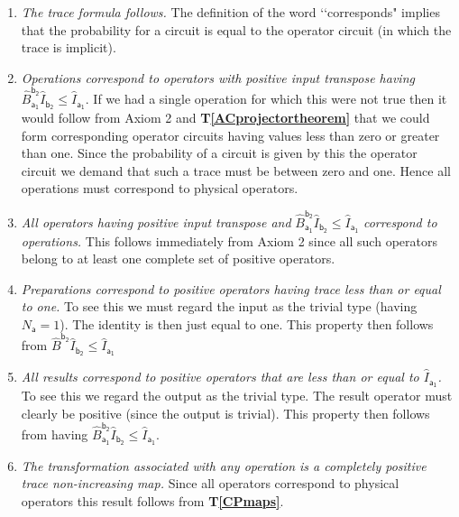 \documentclass[10pt]{article}
\begin{document}
\begin{enumerate}
\item \emph{The trace formula follows.}  The definition of the word \lq\lq corresponds" implies that the probability for a circuit is equal to the operator circuit (in which the trace is implicit).
\item \emph{Operations correspond to operators with positive input transpose having} $\hat B_\mathsf{a_1}^\mathsf{b_2}\hat I_\mathsf{b_2} \leq \hat I_\mathsf{a_1}$. If we had a single operation for which this were not true then it would follow from Axiom 2 and {\bf T\ref{ACprojectortheorem}} that we could form corresponding operator circuits having values less than zero or greater than one.  Since the probability of a circuit is given by this the operator circuit we demand that such a trace must be between zero and one.  Hence all operations must correspond to physical operators.
\item \emph{All operators having positive input transpose and} $\hat B_\mathsf{a_1}^\mathsf{b_2}\hat I_\mathsf{b_2} \leq \hat I_\mathsf{a_1}$ \emph{correspond to operations.}  This follows immediately from Axiom 2 since all such operators belong to at least one complete set of positive operators.
\item \emph{Preparations correspond to positive operators having trace less than or equal to one.}  To see this we must regard the input as the trivial type (having $N_\mathsf{a}=1$).  The identity is then just equal to one.  This property then follows from $\hat B^\mathsf{b_2}\hat I_\mathsf{b_2} \leq \hat I_\mathsf{a_1}$
\item \emph{All results correspond to positive operators that are less than or equal to $\hat I_\mathsf{a_1}$.}  To see this we regard the output as the trivial type.  The result operator must clearly be positive (since the output is trivial).  This property then follows from having $\hat B_\mathsf{a_1}^\mathsf{b_2}\hat I_\mathsf{b_2} \leq \hat I_\mathsf{a_1}$.
\item \emph{The transformation associated with any operation is a completely positive trace non-increasing map.}  Since all operators correspond to physical operators this result follows from {\bf T\ref{CPmaps}}.
\end{enumerate}
\end{document}
